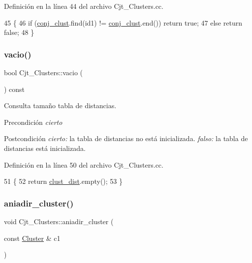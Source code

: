 Definición en la línea 44 del archivo Cjt\+\_\+\+Clusters.\+cc.


\begin{DoxyCode}
45 \{
46     \textcolor{keywordflow}{if} (\hyperlink{class_cjt___clusters_a1202e93aafa953b2dc9a76d03f056b08}{conj\_clust}.find(id1) != \hyperlink{class_cjt___clusters_a1202e93aafa953b2dc9a76d03f056b08}{conj\_clust}.end()) \textcolor{keywordflow}{return} \textcolor{keyword}{true};
47     \textcolor{keywordflow}{else} \textcolor{keywordflow}{return} \textcolor{keyword}{false};
48 \}
\end{DoxyCode}
\mbox{\label{class_cjt___clusters_aeeea0be1e59431ef029fb42ce1aaddc6}} 
\subsubsection{\texorpdfstring{vacio()}{vacio()}}
{\footnotesize\ttfamily bool Cjt\+\_\+\+Clusters\+::vacio (\begin{DoxyParamCaption}{ }\end{DoxyParamCaption}) const}



Consulta tamaño tabla de distancias. 

\begin{DoxyPrecond}{Precondición}
{\itshape cierto} 
\end{DoxyPrecond}
\begin{DoxyPostcond}{Postcondición}
{\itshape cierto\+:} la tabla de distancias no está inicializada. {\itshape falso\+:} la tabla de distancias está inicializada. 
\end{DoxyPostcond}


Definición en la línea 50 del archivo Cjt\+\_\+\+Clusters.\+cc.


\begin{DoxyCode}
51 \{
52     \textcolor{keywordflow}{return} \hyperlink{class_cjt___clusters_a2e0931084578a4abb26d17bf289628d2}{clust\_dist}.empty();
53 \}
\end{DoxyCode}
\mbox{\label{class_cjt___clusters_a24a17b55baa8d3aba4df83e9b61508fa}} 
\subsubsection{\texorpdfstring{aniadir\+\_\+cluster()}{aniadir\_cluster()}}
{\footnotesize\ttfamily void Cjt\+\_\+\+Clusters\+::aniadir\+\_\+cluster (\begin{DoxyParamCaption}\item[{const \hyperlink{class_cluster}{Cluster} \&}]{c1 }\end{DoxyParamCaption})}



